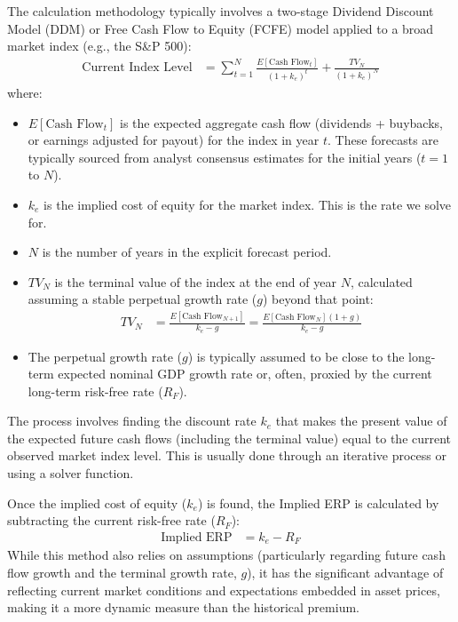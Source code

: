 The calculation methodology typically involves a two-stage Dividend Discount Model (DDM) or Free Cash Flow to Equity (FCFE) model applied to a broad market index (e.g., the S\&P 500):
\begin{align*}
    \text{Current Index Level} & = \sum_{t=1}^{N} \frac{E[\text{Cash Flow}_t]}{(1+k_e)^t} + \frac{TV_N}{(1+k_e)^N}
\end{align*}
where:
\begin{itemize}
    \item \(E[\text{Cash Flow}_t]\) is the expected aggregate cash flow (dividends + buybacks, or earnings adjusted for payout) for the index in year \(t\). These forecasts are typically sourced from analyst consensus estimates for the initial years (\(t=1\) to \(N\)).
    \item \(k_e\) is the implied cost of equity for the market index. This is the rate we solve for.
    \item \(N\) is the number of years in the explicit forecast period.
    \item \(TV_N\) is the terminal value of the index at the end of year \(N\), calculated assuming a stable perpetual growth rate (\(g\)) beyond that point:
          \begin{align*}
              TV_N & = \frac{E[\text{Cash Flow}_{N+1}]}{k_e - g} = \frac{E[\text{Cash Flow}_N](1+g)}{k_e - g}
          \end{align*}
    \item The perpetual growth rate (\(g\)) is typically assumed to be close to the long-term expected nominal GDP growth rate or, often, proxied by the current long-term risk-free rate (\(R_F\)).
\end{itemize}
The process involves finding the discount rate \(k_e\) that makes the present value of the expected future cash flows (including the terminal value) equal to the current observed market index level. This is usually done through an iterative process or using a solver function.

Once the implied cost of equity (\(k_e\)) is found, the Implied ERP is calculated by subtracting the current risk-free rate (\(R_F\)):
\begin{align*}
    \text{Implied ERP} & = k_e - R_F
\end{align*}
While this method also relies on assumptions (particularly regarding future cash flow growth and the terminal growth rate, \(g\)), it has the significant advantage of reflecting current market conditions and expectations embedded in asset prices, making it a more dynamic measure than the historical premium.

